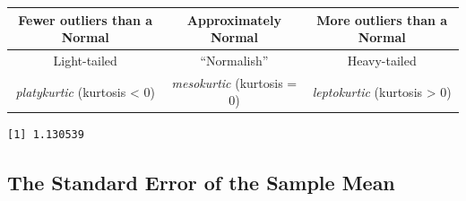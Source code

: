 \documentclass[
]{book}
\newenvironment{Shaded}{\begin{snugshade}}{\end{snugshade}}
\newcommand{\KeywordTok}[1]{\textcolor[rgb]{0.13,0.29,0.53}{\textbf{#1}}}
\newcommand{\NormalTok}[1]{#1}
\newcommand{\OperatorTok}[1]{\textcolor[rgb]{0.81,0.36,0.00}{\textbf{#1}}}
\begin{document}
\begin{longtable}[]{@{}ccc@{}}
\toprule
\begin{minipage}[b]{0.34\columnwidth}\centering
Fewer outliers than a Normal\strut
\end{minipage} & \begin{minipage}[b]{0.24\columnwidth}\centering
Approximately Normal\strut
\end{minipage} & \begin{minipage}[b]{0.33\columnwidth}\centering
More outliers than a Normal\strut
\end{minipage}\tabularnewline
\midrule
\endhead
\begin{minipage}[t]{0.34\columnwidth}\centering
Light-tailed\strut
\end{minipage} & \begin{minipage}[t]{0.24\columnwidth}\centering
``Normalish''\strut
\end{minipage} & \begin{minipage}[t]{0.33\columnwidth}\centering
Heavy-tailed\strut
\end{minipage}\tabularnewline
\begin{minipage}[t]{0.34\columnwidth}\centering
\emph{platykurtic} (kurtosis \textless{} 0)\strut
\end{minipage} & \begin{minipage}[t]{0.24\columnwidth}\centering
\emph{mesokurtic} (kurtosis = 0)\strut
\end{minipage} & \begin{minipage}[t]{0.33\columnwidth}\centering
\emph{leptokurtic} (kurtosis \textgreater{} 0)\strut
\end{minipage}\tabularnewline
\bottomrule
\end{longtable}

\begin{Shaded}
\end{Shaded}

\begin{verbatim}
[1] 1.130539
\end{verbatim}

\hypertarget{the-standard-error-of-the-sample-mean}{%
\subsection{The Standard Error of the Sample Mean}\label{the-standard-error-of-the-sample-mean}}
\end{document}
